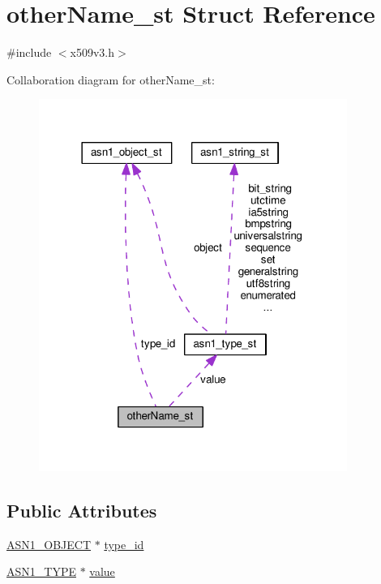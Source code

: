 \hypertarget{structother_name__st}{}\section{other\+Name\+\_\+st Struct Reference}
\label{structother_name__st}


{\ttfamily \#include $<$x509v3.\+h$>$}



Collaboration diagram for other\+Name\+\_\+st\+:
\nopagebreak
\begin{figure}[H]
\begin{center}
\leavevmode
\includegraphics[width=285pt]{structother_name__st__coll__graph}
\end{center}
\end{figure}
\subsection*{Public Attributes}
\begin{DoxyCompactItemize}
\item 
\hyperlink{asn1_8h_ae10c08e4e6b23f67a39b2add932ec48f}{A\+S\+N1\+\_\+\+O\+B\+J\+E\+CT} $\ast$ \hyperlink{structother_name__st_a6a75851c46b8796a1f986ef545d423a6}{type\+\_\+id}
\item 
\hyperlink{asn1_8h_a7895e03d9fee2bc4963faf2a31a9439e}{A\+S\+N1\+\_\+\+T\+Y\+PE} $\ast$ \hyperlink{structother_name__st_a490a0f0d33dd8e1b7a2283b6da0951d5}{value}
\end{DoxyCompactItemize}


